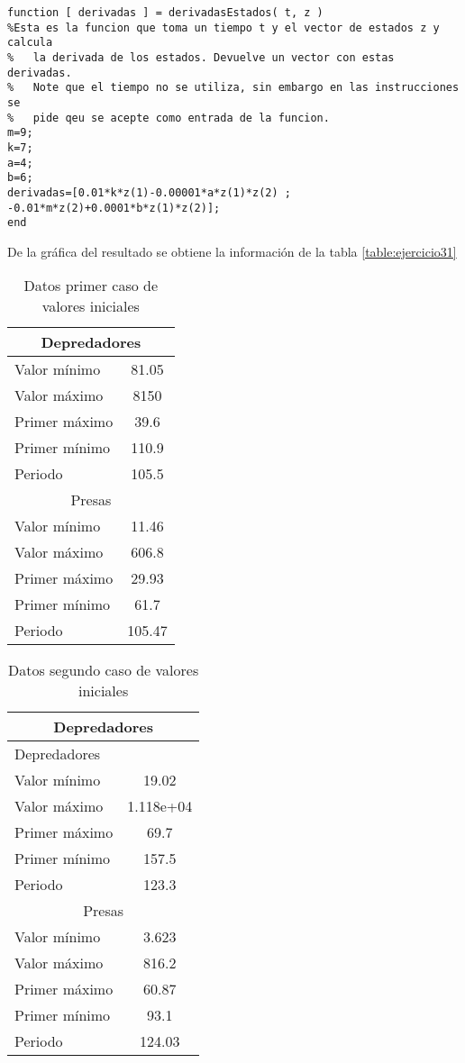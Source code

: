 \documentclass {article}
\begin{document}
\begin{lstlisting}
function [ derivadas ] = derivadasEstados( t, z )
%Esta es la funcion que toma un tiempo t y el vector de estados z y calcula
%   la derivada de los estados. Devuelve un vector con estas derivadas.
%   Note que el tiempo no se utiliza, sin embargo en las instrucciones se
%   pide qeu se acepte como entrada de la funcion.
m=9;
k=7;
a=4;
b=6;
derivadas=[0.01*k*z(1)-0.00001*a*z(1)*z(2) ; -0.01*m*z(2)+0.0001*b*z(1)*z(2)];
end
\end{lstlisting}


De la gráfica del resultado se obtiene la información de la tabla \ref{table:ejercicio31}
\begin{table}
\caption{Datos primer caso de valores iniciales}
\centering
\begin{tabular}{| l | c |}
  \hline
 \multicolumn{2}{|c|}{Depredadores} \\
 \hline
 Valor mínimo &81.05 \\
 Valor máximo &8150\\
 Primer máximo&39.6\\
 Primer mínimo&110.9\\
 Periodo      &105.5\\
 \hline
 \multicolumn{2}{|c|}{Presas} \\
 \hline
 Valor mínimo &11.46\\
 Valor máximo &606.8\\
 Primer máximo&29.93\\
 Primer mínimo&61.7\\
 Periodo      &105.47\\
 \hline
\end{tabular}
\end{table}


\begin{table}
\caption{Datos segundo caso de valores iniciales}
\centering
\begin{tabular}{| l| c| }
\hline
  \multicolumn{2}{|c|}{Depredadores} \\
\hline
  Depredadores & \\
  Valor mínimo &19.02\\
  Valor máximo &1.118e+04\\
  Primer máximo&69.7\\
  Primer mínimo&157.5\\
  Periodo      &123.3\\
\hline
  \multicolumn{2}{|c|}{Presas} \\
\hline
  Valor mínimo &3.623\\
  Valor máximo &816.2\\
  Primer máximo&60.87\\
  Primer mínimo&93.1\\
  Periodo      &124.03\\
\hline 
\end{tabular}
\end{table}
\end{document}
